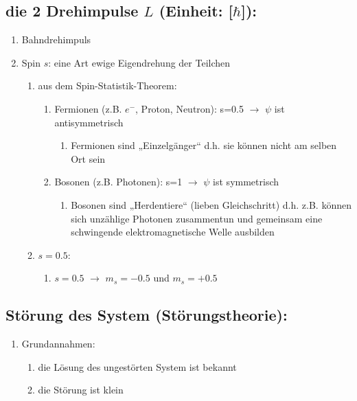 \subsection{die 2 Drehimpulse $L$ (\textbf{Einheit}: [$\hbar$]):} \label{Drehimpuls}
\begin{enumerate}
    \item Bahndrehimpuls
    \item Spin $s$: eine Art ewige Eigendrehung der Teilchen
\begin{enumerate}
    \item aus dem Spin-Statistik-Theorem:
\begin{enumerate}
    \item Fermionen (z.B. $e^-$, Proton, Neutron): s=0.5  $\rightarrow$ $\psi$ ist antisymmetrisch
    \begin{enumerate}
        \item Fermionen sind „Einzelgänger“ d.h. sie können nicht am selben Ort sein
    \end{enumerate}
    \item Bosonen (z.B. Photonen): s=1 $\rightarrow$ $\psi$ ist symmetrisch 
    \begin{enumerate}
        \item Bosonen sind „Herdentiere“ (lieben Gleichschritt) d.h. z.B.  können sich unzählige
        Photonen zusammentun und gemeinsam eine schwingende elektromagnetische Welle ausbilden 
    \end{enumerate}
\end{enumerate}
\item $s=0.5$:
\begin{enumerate}
    \item $s=0.5$ $\rightarrow$ $m_s=-0.5$ und $m_s=+0.5$
\end{enumerate}
\end{enumerate}
\end{enumerate}



\subsection{Störung des System (Störungstheorie):}
\begin{enumerate}
    \item Grundannahmen:
    \begin{enumerate}
        \item die Lösung des ungestörten System ist bekannt
        \item die Störung ist klein
    \end{enumerate}
\end{enumerate}